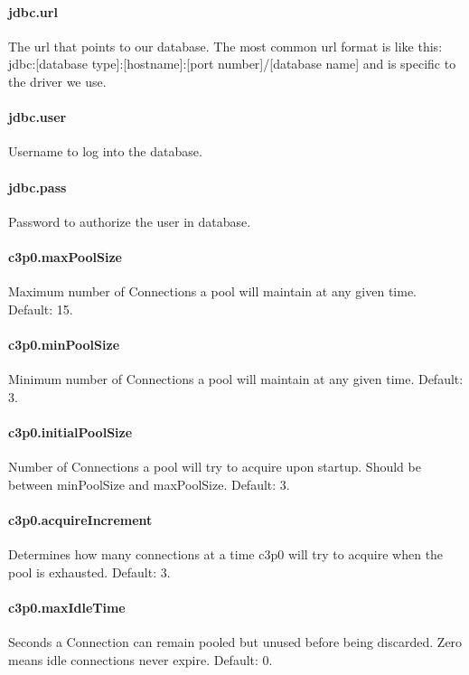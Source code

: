 \paragraph{jdbc.url}
 The url that points to our database. The most common url format is like this:
jdbc:[database type]:[hostname]:[port number]/[database name]
and is specific to the driver we use.

\paragraph{jdbc.user}
Username to log into the database.

\paragraph{jdbc.pass}
Password to authorize the user in database.

\paragraph{c3p0.maxPoolSize}
Maximum number of Connections a pool will maintain at any given time.
Default: 15.

\paragraph{c3p0.minPoolSize}
Minimum number of Connections a pool will maintain at any given time.
Default: 3.

\paragraph{c3p0.initialPoolSize}
Number of Connections a pool will try to acquire upon startup. Should be between
minPoolSize and maxPoolSize.
Default: 3.

\paragraph{c3p0.acquireIncrement}
Determines how many connections at a time c3p0 will try to acquire when the pool
is exhausted.
Default: 3.

\paragraph{c3p0.maxIdleTime}
Seconds a Connection can remain pooled but unused before being discarded. Zero
means idle connections never expire.
Default: 0.

